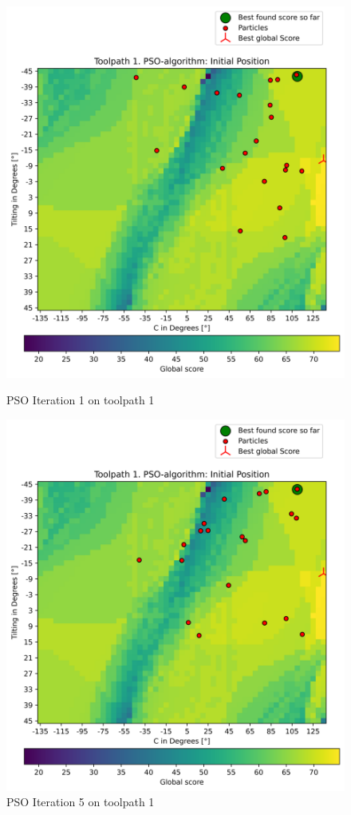 	
\begin{figure}[H]	
	\centering
	\begin{minipage}{0.5\textwidth}
		\includegraphics[width=\textwidth]{figures/swarm_true/1_1.png}
		\caption{PSO Iteration 1 on toolpath 1}
		\label{tp1_0}
	\end{minipage}\hfill
	\begin{minipage}{0.5\textwidth}
		\includegraphics[width=\textwidth]{figures/swarm_true/1_5.png}
		\caption{PSO Iteration 5 on toolpath 1}
		\label{tp1_5}
	\end{minipage}\par
\end{figure}


